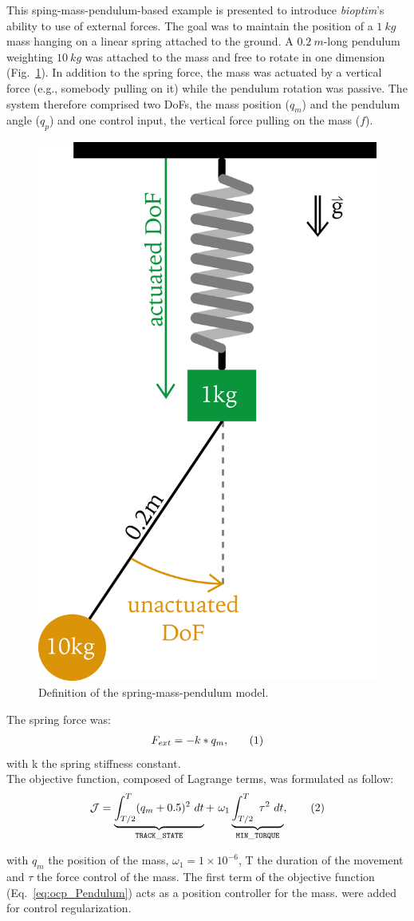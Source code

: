 This sping-mass-pendulum-based example is presented to introduce \textit{bioptim}'s ability to use of external forces.
The goal was to maintain the position of a $\SI{1}{kg}$ mass hanging on a linear spring attached to the ground.
A $\SI{0.2}{m}$-long pendulum weighting $\SI{10}{kg}$ was attached to the mass and free to rotate in one dimension (Fig.~\ref{fig:Mass_Pendulum_Model}).
In addition to the spring force, the mass was actuated by a vertical force (e.g., somebody pulling on it) while the pendulum rotation was passive.
The system therefore comprised two DoFs, the mass position ($q_m$) and the pendulum angle ($q_p$) and one control input, the vertical force pulling on the mass ($f$). 
\begin{figure}[h!]
\centering
\includegraphics[width=0.35\columnwidth]{figures/Mass_Pendulum_Model.png}
\caption{Definition of the spring-mass-pendulum model.}
\label{fig:Mass_Pendulum_Model}
\end{figure}
The spring force was:
\[
\begin{aligned}
F_{ext} = -k*q_m,
\end{aligned}
\addtag
\label{eq:f_ext}
\]
with k the spring stiffness constant.\\
The objective function, composed of Lagrange terms, was formulated as follow:
\[
\mathcal{J} = \underbrace{\int_{T/2}^T (q_m + 0.5)^2~dt}_{\mathtt{TRACK\_STATE}}  +~\omega_1 \underbrace{\int_{T/2}^T ~\tau^2~dt}_{\mathtt{MIN\_ TORQUE}},
\addtag
\label{eq:ocp_Pendulum}
\]

\noindent with $q_m$ the position of the mass, $\omega_1 = 1\times 10^{-6}$, T the duration of the movement and $\tau$ the force control of the mass.
The first term of the objective function (Eq.~\ref{eq:ocp_Pendulum}) acts as a position controller for the mass.
 were added for control regularization.

